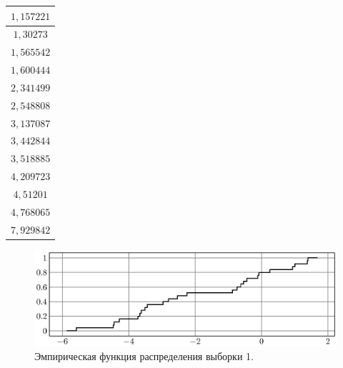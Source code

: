 \begin{table}[h]
\begin{minipage}[h]{0.49\linewidth}
\begin{center}
\begin{tabular}{|c|}
          $1{,}157221$ \\
          \hline 
        
          $1{,}30273$ \\
          \hline 
        
          $1{,}565542$ \\
          \hline 
        
          $1{,}600444$ \\
          \hline 
        
          $2{,}341499$ \\
          \hline 
        
          $2{,}548808$ \\
          \hline 
        
          $3{,}137087$ \\
          \hline 
        
          $3{,}442844$ \\
          \hline 
        
          $3{,}518885$ \\
          \hline 
        
          $4{,}209723$ \\
          \hline 
        
          $4{,}51201$ \\
          \hline 
        
          $4{,}768065$ \\
          \hline 
        
          $7{,}929842$ \\
          \hline 
        
      \end{tabular}
    \end{center}
  \end{minipage}
\end{table}

\begin{figure}[h]
  \includegraphics[scale=1]{images/st.1.eps}
  \caption{Эмпирическая функция распределения выборки 1.}\label{pic1}
\end{figure}

